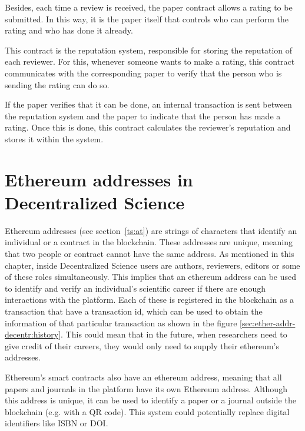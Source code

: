 Besides, each time a review is received, the paper contract allows a rating to
be submitted. In this way, it is the paper itself that controls who can perform
the rating and who has done it already.


This contract is the reputation system, responsible for storing the reputation
of each reviewer. For this, whenever someone wants to make a rating, this
contract communicates with the corresponding paper to verify that the person who
is sending the rating can do so.

If the paper verifies that it can be done, an internal transaction is sent
between the reputation system and the paper to indicate that the person has made
a rating. Once this is done, this contract calculates the reviewer's reputation
and stores it within the system.

\section{Ethereum addresses in Decentralized Science}
\label{sec:ether-addr-decentr}


Ethereum addresses (see section~\ref{ts:at}) are strings of characters that
identify an individual or a contract in the blockchain. These addresses are
unique, meaning that two people or contract cannot have the same address. As
mentioned in this chapter, inside Decentralized Science users are authors,
reviewers, editors or some of these roles simultaneously. This implies that an
ethereum address can be used to identify and verify an individual's scientific
career if there are enough interactions with the platform. Each of these is
registered in the blockchain as a transaction that have a transaction id, which
can be used to obtain the information of that particular transaction as shown in
the figure \ref{sec:ether-addr-decentr:history}. This could mean that in the
future, when researchers need to give credit of their careers, they would only
need to supply their ethereum's addresses.


Ethereum's smart contracts also have an ethereum address, meaning that all
papers and journals in the platform have its own Ethereum address. Although this
address is unique, it can be used to identify a paper or a journal outside the
blockchain (e.g. with a QR code). This system could potentially replace digital
identifiers like ISBN or DOI.

